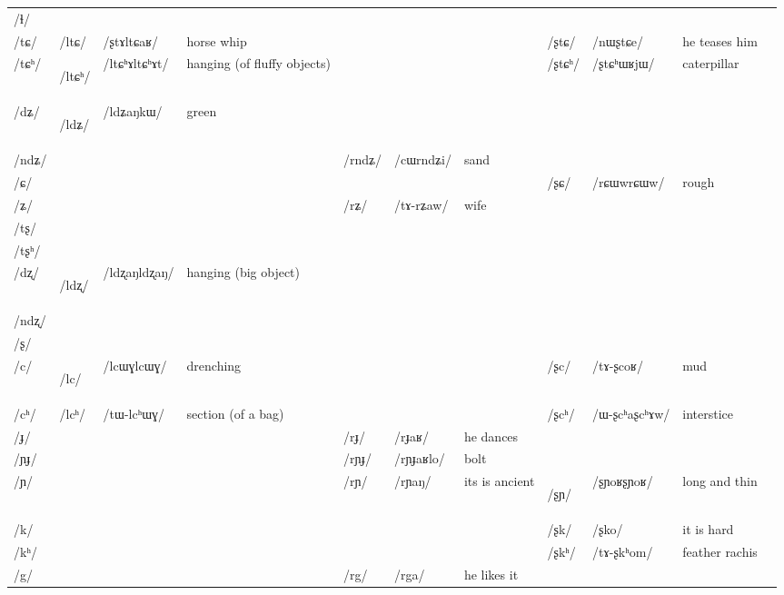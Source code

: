 \documentclass[oneside,a4paper,11pt]{article}
\newcommand{\ipa}[1]{\mbox{\phon/#1/}}
\newcommand{\deux}[1]{\ipa{#1}\addtocounter{2clusters}{1}}
\newcommand{\tib}[1]{\cellcolor{lightgray}\textbf{#1}}
\newcommand{\idph}[1]{\cellcolor{gray}\textbf{#1}}
\begin{document}
\begin{table}
{\begin{tabular}{l|lll|lll|lll|l}
\ipa{ɬ}  & 	  & 	  & 	  & 	  & 	  & 	  & 	 & 	 & 	 & 	\\	
\ipa{tɕ}  & 	 \deux{ltɕ}  & 	 \ipa{ʂtɤltɕaʁ}  & 	 horse whip  & 	 & 	 & 	 & 	 \deux{ʂtɕ}  & 	 \ipa{nɯʂtɕe}  & 	he teases him  & 	\\	
\ipa{tɕʰ}  & 	 \deux{ltɕʰ} \idph{}  & 	 \ipa{ltɕʰɤltɕʰɤt}  & 	hanging (of fluffy objects)  & 	 & 	 & 	 & 	 \deux{ʂtɕʰ}  & 	 \ipa{ʂtɕʰɯʁjɯ}  & 	caterpillar  & 	\\	
\ipa{dʑ}  & 	 \deux{ldʑ} \tib{}  & 	 \ipa{ldʑaŋkɯ}  & 	 green & 	  & 	  & 	  & 	 & 	 & 	 & 	\\	
\ipa{ndʑ}  & 	  & 	  & 	  & 	 \deux{rndʑ}  & 	 \ipa{cɯrndʑi}  & 	sand  & 	 & 	 & 	 & 	\\	
\ipa{ɕ}  & 	  & 	  & 	  & 	 & 	 & 	 & 	 \deux{ʂɕ}  & 	 \ipa{rɕɯwrɕɯw}  & 	rough & 	\\	
\ipa{ʑ}  & 	  & 	  & 	  & 	 \deux{rʑ}  & 	 \ipa{tɤ-rʑaw}  & 	wife  & 	 & 	 & 	 & 	\\	
\ipa{tʂ}  & 	  & 	  & 	  & 	  & 	  & 	  & 	 & 	 & 	 & 	\\	
\ipa{tʂʰ}  & 	  & 	  & 	  & 	  & 	  & 	  & 	 & 	 & 	 & 	\\	
\ipa{dʐ}  & 	 \deux{ldʐ} \idph{}  & 	 \ipa{ldʐaŋldʐaŋ}  & 	 hanging (big object) & 	  & 	  & 	  & 	 & 	 & 	 & 	\\	
\ipa{ndʐ}  & 	  & 	  & 	  & 	  & 	  & 	  & 	 & 	 & 	 & 	\\	
\ipa{ʂ}  & 	  & 	  & 	  & 	  & 	  & 	  & 	 & 	 & 	 & 	\\	
\ipa{c}  & 	 \deux{lc} \idph{} & 	 \ipa{lcɯɣlcɯɣ}  & 	 drenching & 	 & 	 & 	 & 	 \deux{ʂc}  & 	 \ipa{tɤ-ʂcoʁ}  & 	 mud & 	\\	
\ipa{cʰ}  & 	 \deux{lcʰ}  & 	 \ipa{tɯ-lcʰɯɣ}  & 	 section (of a bag) & 	 & 	 & 	 & 	 \deux{ʂcʰ}  & 	 \ipa{ɯ-ʂcʰaʂcʰɤw}  & 	 interstice & 	\\	
\ipa{ɟ}  & 	  & 	  & 	  & 	 \deux{rɟ}  & 	 \ipa{rɟaʁ}  & 	he dances  & 	 & 	 & 	 & 	\\	
\ipa{ɲɟ}  & 	  & 	  & 	  & 	 \deux{rɲɟ}  & 	 \ipa{rɲɟaʁlo}  & 	 bolt & 	 & 	 & 	 & 	\\	
\ipa{ɲ}  & 	  & 	  & 	  & 	 \deux{rɲ}  & 	 \ipa{rɲaŋ}  & 	 its is ancient & 	 \deux{ʂɲ} \idph{}  & 	\ipa{ʂɲoʁʂɲoʁ} & 	long and thin & 	\\	
\ipa{k}  & 	  & 	  & 	  & 	 & 	 & 	 & 	 \deux{ʂk}  & 	 \ipa{ʂko}  & 	 it is hard & 	\\	
\ipa{kʰ}  & 	  & 	  & 	  & 	 & 	 & 	 & 	 \deux{ʂkʰ}  & 	 \ipa{tɤ-ʂkʰom}  & 	 feather rachis & 	\\	
\ipa{g}  & 	  & 	  & 	  & 	 \deux{rg}  & 	 \ipa{rga}  & 	 he likes it & 	 & 	 & 	 & 	\\	

\end{tabular}}
\end{table}
\end{document}

